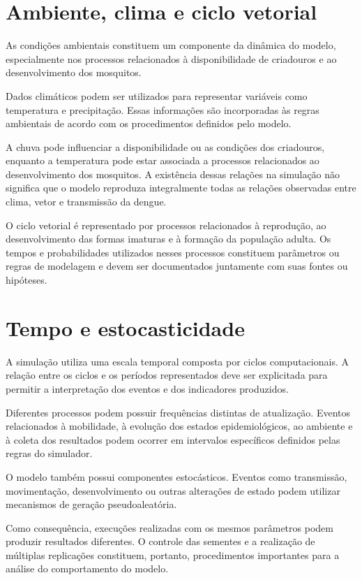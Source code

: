 \section{Ambiente, clima e ciclo vetorial}

As condições ambientais constituem um componente da dinâmica do modelo, especialmente nos processos relacionados à disponibilidade de criadouros e ao desenvolvimento dos mosquitos.

Dados climáticos podem ser utilizados para representar variáveis como temperatura e precipitação. Essas informações são incorporadas às regras ambientais de acordo com os procedimentos definidos pelo modelo.

A chuva pode influenciar a disponibilidade ou as condições dos criadouros, enquanto a temperatura pode estar associada a processos relacionados ao desenvolvimento dos mosquitos. A existência dessas relações na simulação não significa que o modelo reproduza integralmente todas as relações observadas entre clima, vetor e transmissão da dengue.

O ciclo vetorial é representado por processos relacionados à reprodução, ao desenvolvimento das formas imaturas e à formação da população adulta. Os tempos e probabilidades utilizados nesses processos constituem parâmetros ou regras de modelagem e devem ser documentados juntamente com suas fontes ou hipóteses.

\section{Tempo e estocasticidade}

A simulação utiliza uma escala temporal composta por ciclos computacionais. A relação entre os ciclos e os períodos representados deve ser explicitada para permitir a interpretação dos eventos e dos indicadores produzidos.

Diferentes processos podem possuir frequências distintas de atualização. Eventos relacionados à mobilidade, à evolução dos estados epidemiológicos, ao ambiente e à coleta dos resultados podem ocorrer em intervalos específicos definidos pelas regras do simulador.

O modelo também possui componentes estocásticos. Eventos como transmissão, movimentação, desenvolvimento ou outras alterações de estado podem utilizar mecanismos de geração pseudoaleatória.

Como consequência, execuções realizadas com os mesmos parâmetros podem produzir resultados diferentes. O controle das sementes e a realização de múltiplas replicações constituem, portanto, procedimentos importantes para a análise do comportamento do modelo.

